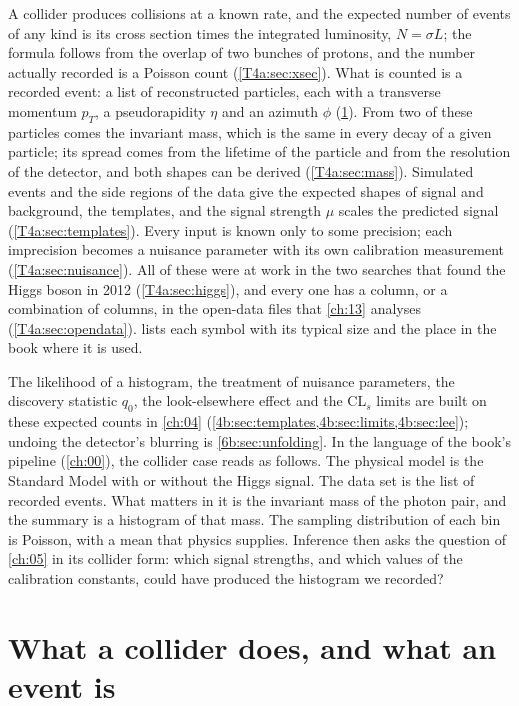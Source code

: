 A collider produces collisions at a known rate, and the expected number of events of any kind is its cross section times the integrated luminosity, $N=\sigma L$; the formula follows from the overlap of two bunches of protons, and the number actually recorded is a Poisson count (\cref{T4a:sec:xsec}). What is counted is a recorded event: a list of reconstructed particles, each with a transverse momentum $p_T$, a pseudorapidity $\eta$ and an azimuth $\phi$ (\cref{T4a:sec:events}). From two of these particles comes the invariant mass, which is the same in every decay of a given particle; its spread comes from the lifetime of the particle and from the resolution of the detector, and both shapes can be derived (\cref{T4a:sec:mass}). Simulated events and the side regions of the data give the expected shapes of signal and background, the templates, and the signal strength $\mu$ scales the predicted signal (\cref{T4a:sec:templates}). Every input is known only to some precision; each imprecision becomes a nuisance parameter with its own calibration measurement (\cref{T4a:sec:nuisance}). All of these were at work in the two searches that found the Higgs boson in 2012 (\cref{T4a:sec:higgs}), and every one has a column, or a combination of columns, in the open-data files that \cref{ch:13} analyses (\cref{T4a:sec:opendata}).  lists each symbol with its typical size and the place in the book where it is used.

The likelihood of a histogram, the treatment of nuisance parameters, the discovery statistic $q_0$, the look-elsewhere effect and the CL$_s$ limits are built on these expected counts in \cref{ch:04} (\cref{4b:sec:templates,4b:sec:limits,4b:sec:lee}); undoing the detector's blurring is \cref{6b:sec:unfolding}. In the language of the book's pipeline (\cref{ch:00}), the collider case reads as follows. The physical model is the Standard Model with or without the Higgs signal. The data set is the list of recorded events. What matters in it is the invariant mass of the photon pair, and the summary is a histogram of that mass. The sampling distribution of each bin is Poisson, with a mean that physics supplies. Inference then asks the question of \cref{ch:05} in its collider form: which signal strengths, and which values of the calibration constants, could have produced the histogram we recorded?
\section{What a collider does, and what an event is}
\label{T4a:sec:events}


